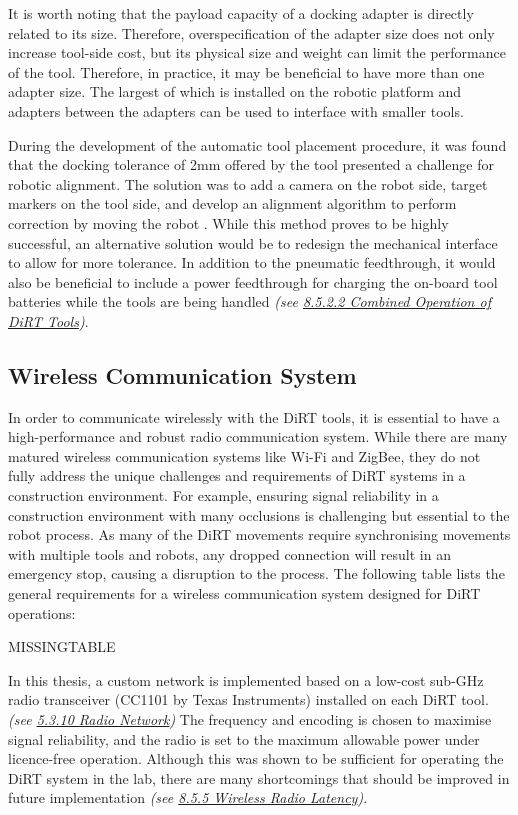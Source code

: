 It is worth noting that the payload capacity of a docking adapter is directly related to its size. Therefore, overspecification of the adapter size does not only increase tool-side cost, but its physical size and weight can limit the performance of the tool. Therefore, in practice, it may be beneficial to have more than one adapter size. The largest of which is installed on the robotic platform and adapters between the adapters can be used to interface with smaller tools.

During the development of the automatic tool placement procedure, it was found that the docking tolerance of 2mm offered by the tool presented a challenge for robotic alignment. The solution was to add a camera on the robot side, target markers on the tool side, and develop an alignment algorithm to perform correction by moving the robot . While this method proves to be highly successful, an alternative solution would be to redesign the mechanical interface to allow for more tolerance. In addition to the pneumatic feedthrough, it would also be beneficial to include a power feedthrough for charging the on-board tool batteries while the tools are being handled \textit{(see \ul{8.5.2.2 Combined Operation of DiRT Tools})}. 

\subsection{Wireless Communication System}
\label{subsection:discussion_wireless_communication_system}

In order to communicate wirelessly with the DiRT tools, it is essential to have a high-performance and robust radio communication system. While there are many matured wireless communication systems like Wi-Fi and ZigBee, they do not fully address the unique challenges and requirements of DiRT systems in a construction environment. For example, ensuring signal reliability in a construction environment with many occlusions is challenging but essential to the robot process. As many of the DiRT movements require synchronising movements with multiple tools and robots, any dropped connection will result in an emergency stop, causing a disruption to the process. The following table lists the general requirements for a wireless communication system designed for DiRT operations:

MISSINGTABLE

In this thesis, a custom network is implemented based on a low-cost sub-GHz radio transceiver (CC1101 by Texas Instruments) installed on each DiRT tool. \textit{(see \ul{5.3.10 Radio Network}) }The frequency and encoding is chosen to maximise signal reliability, and the radio is set to the maximum allowable power under licence-free operation. Although this was shown to be sufficient for operating the DiRT system in the lab, there are many shortcomings that should be improved in future implementation \textit{(see \ul{8.5.5 Wireless Radio Latency})}.

